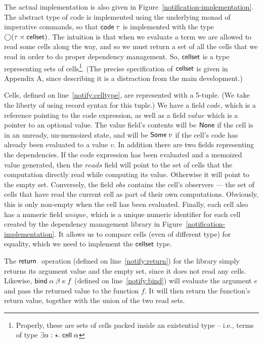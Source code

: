 \documentclass[natbib]{sigplanconf}
\begin{document}
The actual implementation is also given in
Figure~\ref{notification-implementation}. The abstract type of code is
implemented using the underlying monad of imperative commands, so that
$\mbox{\textsf{{code}}}\;{\tau}$ is implemented with the type $\bigcirc{(\tau \times
  \mbox{\textsf{{cellset}}})}$.  The intuition is that when we evaluate a term we are
allowed to read some cells along the way, and so we must return a set of
all the cells that we read in order to do proper dependency
management. So, $\mbox{\textsf{{cellset}}}$ is a type representing sets of
cells\footnote{Properly, these are sets of cells packed inside an
  existential type -- i.e., terms of type $\exists \alpha:\star.\;
  \mbox{\textsf{{cell}}}\;{\alpha}$}. (The precise specification of $\mbox{\textsf{{cellset}}}$ is
given in Appendix A, since describing it is a distraction from the
main development.)

Cells, defined on line~\ref{notify:celltype}, are represented with a
5-tuple. (We take the liberty of using record syntax for this tuple.)
We have a field $code$, which is a reference pointing to the code
expression, as well as a field $value$ which is a pointer to an
optional value. The value field's contents will be $\mbox{\textsf{{None}}}$ if
the cell is in an unready, un-memoized state, and will be
$\mbox{\textsf{{Some}}}\;v$ if the cell's code has already been evaluated to a
value $v$. In addition there are two fields representing the
dependencies. If the code expression has been evaluated and a memoized
value generated, then the $reads$ field will point to the set of cells
that the computation directly read while computing its
value. Otherwise it will point to the empty set. Conversely, the field
$obs$ contains the cell's observers --- the set of cells that have
read the current cell as part of their own computations. Obviously,
this is only non-empty when the cell has been evaluated. Finally, each
cell also has a numeric field $unique$, which is a unique numeric
identifier for each cell created by the dependency management library
in Figure~\ref{notification-implementation}. It allows us to compare
cells (even of different type) for equality, which we need to
implement the $\mbox{\textsf{{cellset}}}$ type.

The $\mbox{\textsf{{return}}}\;$ operation (defined on line~\ref{notify:return}) for the
library simply returns its argument value and the empty set, since it
does not read any cells. Likewise, $\mbox{\textsf{{bind}}}\; \alpha\;\beta\;e\;f$ (defined on
line~\ref{notify:bind}) will evaluate the argument $e$ and pass the
returned value to the function $f$. It will then return the function's
return value, together with the union of the two read sets. 
\end{document}
